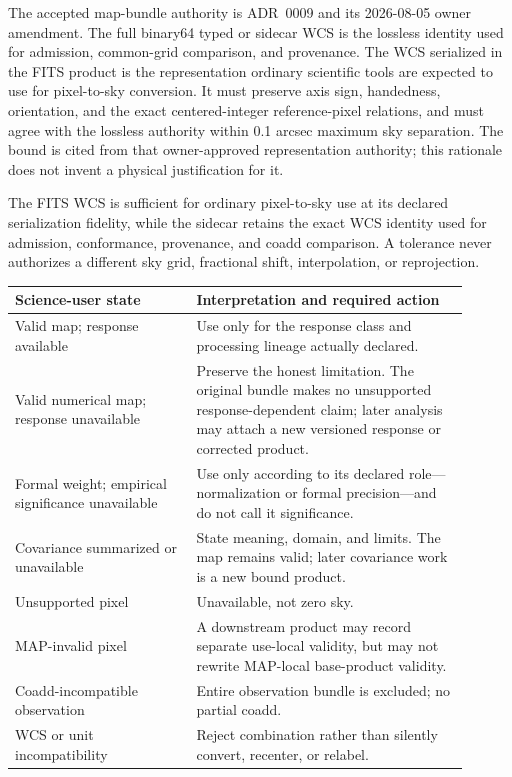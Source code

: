 \documentclass[10pt]{article}
\begin{document}
The accepted map-bundle authority is ADR~0009 and its 2026-08-05 owner
amendment. The full binary64 typed or sidecar WCS is the lossless identity used
for admission, common-grid comparison, and provenance. The WCS serialized in
the FITS product is the representation ordinary scientific tools are expected
to use for pixel-to-sky conversion. It must preserve axis sign, handedness,
orientation, and the exact centered-integer reference-pixel relations, and
must agree with the lossless authority within 0.1 arcsec maximum sky
separation. The bound is cited from that owner-approved representation
authority; this rationale does not invent a physical justification for it.

The FITS WCS is sufficient for ordinary pixel-to-sky use at its declared
serialization fidelity, while the sidecar retains the exact WCS identity used
for admission, conformance, provenance, and coadd comparison. A tolerance
never authorizes a different sky grid, fractional shift, interpolation, or
reprojection.

\begin{longtable}{L{0.36\linewidth}L{0.54\linewidth}}
\toprule Science-user state & Interpretation and required action \\
\midrule
Valid map; response available & Use only for the response class and processing lineage actually declared.\\
Valid numerical map; response unavailable & Preserve the honest limitation. The original bundle makes no unsupported response-dependent claim; later analysis may attach a new versioned response or corrected product.\\
Formal weight; empirical significance unavailable & Use only according to its declared role---normalization or formal precision---and do not call it significance.\\
Covariance summarized or unavailable & State meaning, domain, and limits. The map remains valid; later covariance work is a new bound product.\\
Unsupported pixel & Unavailable, not zero sky.\\
MAP-invalid pixel & A downstream product may record separate use-local validity, but may not rewrite MAP-local base-product validity.\\
Coadd-incompatible observation & Entire observation bundle is excluded; no partial coadd.\\
WCS or unit incompatibility & Reject combination rather than silently convert, recenter, or relabel.\\
\bottomrule
\end{longtable}
\end{document}
